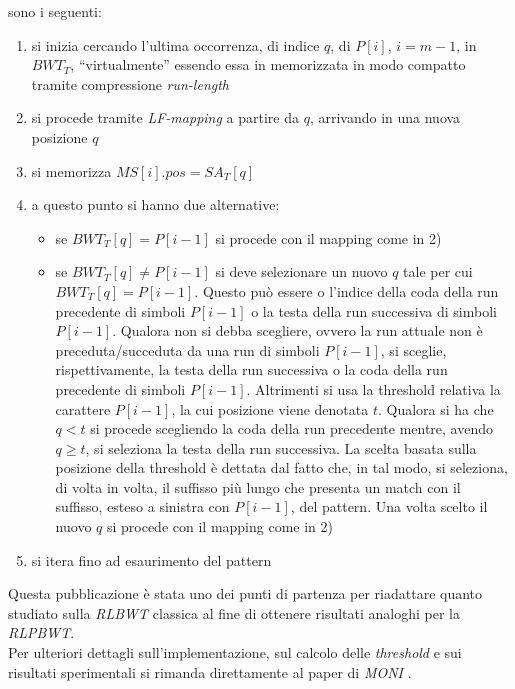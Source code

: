 sono i seguenti: 
\begin{enumerate}
  \item si inizia cercando l'ultima occorrenza, di indice $q$, di $P[i]$,
  $i=m-1$, in $BWT_T$, ``virtualmente'' essendo essa in memorizzata in modo
  compatto tramite compressione \textit{run-length}
  \item si procede tramite \textit{LF-mapping} a partire da $q$, arrivando in
  una nuova posizione $q$
  \item si memorizza $MS[i].pos = SA_T[q]$
  \item a questo punto si hanno due alternative:
  \begin{itemize}
    \item se $BWT_T[q]=P[i-1]$ si procede con il mapping come in 2)
    \item se $BWT_T[q]\neq P[i-1]$ si deve selezionare un nuovo $q$ tale per cui
    $BWT_T[q]=P[i-1]$. Questo può essere o l'indice della coda della run
    precedente di simboli $P[i-1]$ o la testa della run successiva di simboli
    $P[i-1]$. Qualora non si debba scegliere, ovvero la run attuale non è
    preceduta/succeduta da una run di simboli $P[i-1]$, si sceglie,
    rispettivamente, la testa della run successiva o la coda della run
    precedente di simboli $P[i-1]$. Altrimenti si usa la threshold relativa la
    carattere $P[i-1]$, la cui posizione viene denotata $t$. Qualora si ha che
    $q<t$ si procede scegliendo la coda della run precedente mentre, avendo
    $q\geq t$, si seleziona la testa della run successiva. La scelta basata
    sulla posizione della threshold è dettata dal fatto che, in tal modo, si
    seleziona, di volta in volta, il suffisso più lungo che presenta un match
    con il suffisso, esteso a sinistra con $P[i-1]$, del pattern. Una volta
    scelto il nuovo $q$ si procede con il mapping come in 2)
  \end{itemize}
  \item si itera fino ad esaurimento del pattern
\end{enumerate}
Questa pubblicazione è stata uno dei punti di partenza per
riadattare quanto studiato sulla \textit{RLBWT} classica al fine di ottenere
risultati analoghi per la \textit{RLPBWT}.\\
Per ulteriori dettagli sull'implementazione, sul calcolo delle
\textit{threshold} e sui risultati sperimentali si rimanda direttamente al paper
di \textit{MONI} \cite{moni}.
